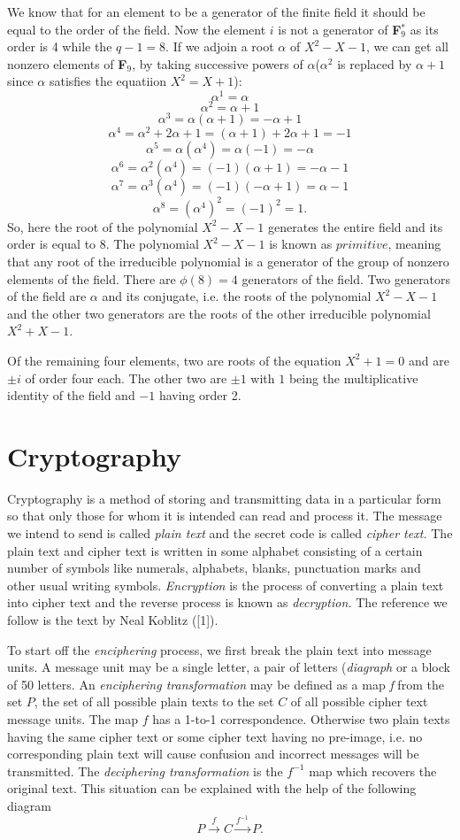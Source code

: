 \documentclass[12pt]{article}
\begin{document}
We know that for an element to be a generator of the finite field it should be equal to the order of the field. Now the element $i$ is not a generator of \textbf{F}$_9^*$ as its order is 4 while the $q-1=8$. If we adjoin a root $\alpha$ of $X^2-X-1$, we can get all nonzero elements of \textbf{F}$_9$, by taking successive powers of $\alpha$($\alpha^2$ is replaced by $\alpha+1$ since $\alpha$ satisfies the equatiion $X^2=X+1$):
$$\alpha^1=\alpha$$
$$\alpha^2=\alpha+1$$
$$\alpha^3=\alpha(\alpha+1)=-\alpha+1$$
$$\alpha^4=\alpha^2+2\alpha+1=(\alpha+1)+2\alpha+1=-1$$
$$\alpha^5=\alpha(\alpha^4)=\alpha(-1)=-\alpha$$
$$\alpha^6=\alpha^2(\alpha^4)=(-1)(\alpha+1)=-\alpha-1$$
$$\alpha^7=\alpha^3(\alpha^4)=(-1)(-\alpha+1)=\alpha-1$$
$$\alpha^8=(\alpha^4)^2=(-1)^2=1.$$
So, here the root of the polynomial $X^2-X-1$ generates the entire field and its order is equal to 8. The polynomial $X^2-X-1$ is known as $primitive$, meaning that any root of the irreducible polynomial is a generator of the group of nonzero elements of the field. There are $\phi(8)=4$ generators of the field. Two generators of the field are $\alpha$ and its conjugate, i.e. the roots of the polynomial $X^2-X-1$ and the other two generators are the roots of the other irreducible polynomial $X^2+X-1$.

Of the remaining four elements, two are roots of the equation $X^2+1=0$ and are $\pm i$ of order four each. The other two are $\pm1$ with $1$ being the multiplicative identity of the field and $-1$ having order 2.




\section{Cryptography}
Cryptography is a method of storing and transmitting data in a
particular form so that only those for whom it is intended can read
and process it. The message we intend to send is called
\textit{plain text} and the secret code is called \textit{cipher
text.} The plain text and cipher text is written in some alphabet
consisting of a certain number of symbols like numerals, alphabets,
blanks, punctuation marks and other usual writing symbols.
\textit{Encryption} is the process of converting a plain text into
cipher text and the reverse process is known as \textit{decryption.}
The reference we follow is the text by Neal Koblitz ([1]).

To start off the \textit{enciphering} process, we first break the plain text into message units. A message unit may be a single letter, a pair of letters (\textit{diagraph} or a block of 50 letters. An \textit{enciphering transformation} may be defined as a map \textit{f} from the set $P$, the set of all possible plain texts to the set $C$ of all possible cipher text message units. The map $f$ has a 1-to-1 correspondence. Otherwise two plain texts having the same cipher text or some cipher text having no pre-image, i.e. no corresponding plain text will cause confusion and incorrect messages will be transmitted. The \textit{deciphering transformation} is the $f^{-1}$ map which recovers the original text.
This situation can be explained with the help of the following diagram
$$P\xrightarrow{f} C\xrightarrow{f^{-1}} P.$$
\end{document}
